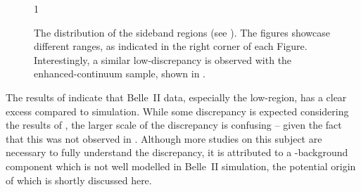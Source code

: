 \begin{figure}[htbp!]
    \centering
    1
    \caption{\label{fig:sidebands_mbc} 
    The \Mbc distribution of the \EB sideband regions (see ).
    The figures showcase different \EB ranges, as indicated in the right corner of each Figure.
    Interestingly, a similar low-\Mbc discrepancy is observed with the enhanced-continuum sample, shown in .
    }
\end{figure}

The results of  indicate that Belle~II data, especially the low-\Mbc region, has a clear excess compared to simulation.
While some discrepancy is expected considering the results of ,
the larger scale of the discrepancy is confusing -- given the fact that this was not observed in .
Although more studies on this subject are necessary to fully understand the discrepancy, 
it is attributed to a \BB-background component which is not well modelled in Belle~II simulation, the potential origin of which is shortly discussed here.

